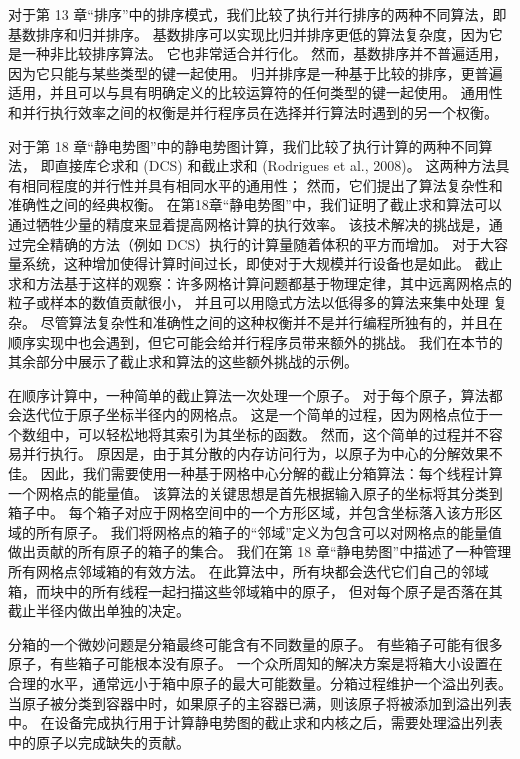 对于第 13 章“排序”中的排序模式，我们比较了执行并行排序的两种不同算法，即基数排序和归并排序。 
基数排序可以实现比归并排序更低的算法复杂度，因为它是一种非比较排序算法。 它也非常适合并行化。 
然而，基数排序并不普遍适用，因为它只能与某些类型的键一起使用。 
归并排序是一种基于比较的排序，更普遍适用，并且可以与具有明确定义的比较运算符的任何类型的键一起使用。 
通用性和并行执行效率之间的权衡是并行程序员在选择并行算法时遇到的另一个权衡。

对于第 18 章“静电势图”中的静电势图计算，我们比较了执行计算的两种不同算法，
即直接库仑求和 (DCS) 和截止求和 (Rodrigues et al., 2008)。 
这两种方法具有相同程度的并行性并具有相同水平的通用性； 然而，它们提出了算法复杂性和准确性之间的经典权衡。 
在第18章“静电势图”中，我们证明了截止求和算法可以通过牺牲少量的精度来显着提高网格计算的执行效率。 
该技术解决的挑战是，通过完全精确的方法（例如 DCS）执行的计算量随着体积的平方而增加。 
对于大容量系统，这种增加使得计算时间过长，即使对于大规模并行设备也是如此。 
截止求和方法基于这样的观察：许多网格计算问题都基于物理定律，其中远离网格点的粒子或样本的数值贡献很小，
并且可以用隐式方法以低得多的算法来集中处理 复杂。 
尽管算法复杂性和准确性之间的这种权衡并不是并行编程所独有的，并且在顺序实现中也会遇到，但它可能会给并行程序员带来额外的挑战。 
我们在本节的其余部分中展示了截止求和算法的这些额外挑战的示例。

在顺序计算中，一种简单的截止算法一次处理一个原子。 对于每个原子，算法都会迭代位于原子坐标半径内的网格点。 
这是一个简单的过程，因为网格点位于一个数组中，可以轻松地将其索引为其坐标的函数。 然而，这个简单的过程并不容易并行执行。 
原因是，由于其分散的内存访问行为，以原子为中心的分解效果不佳。 
因此，我们需要使用一种基于网格中心分解的截止分箱算法：每个线程计算一个网格点的能量值。 
该算法的关键思想是首先根据输入原子的坐标将其分类到箱子中。 
每个箱子对应于网格空间中的一个方形区域，并包含坐标落入该方形区域的所有原子。 
我们将网格点的箱子的“邻域”定义为包含可以对网格点的能量值做出贡献的所有原子的箱子的集合。 
我们在第 18 章“静电势图”中描述了一种管理所有网格点邻域箱的有效方法。 
在此算法中，所有块都会迭代它们自己的邻域箱，而块中的所有线程一起扫描这些邻域箱中的原子，
但对每个原子是否落在其截止半径内做出单独的决定。

分箱的一个微妙问题是分箱最终可能含有不同数量的原子。 有些箱子可能有很多原子，有些箱子可能根本没有原子。 
一个众所周知的解决方案是将箱大小设置在合理的水平，通常远小于箱中原子的最大可能数量。分箱过程维护一个溢出列表。 
当原子被分类到容器中时，如果原子的主容器已满，则该原子将被添加到溢出列表中。 
在设备完成执行用于计算静电势图的截止求和内核之后，需要处理溢出列表中的原子以完成缺失的贡献。

